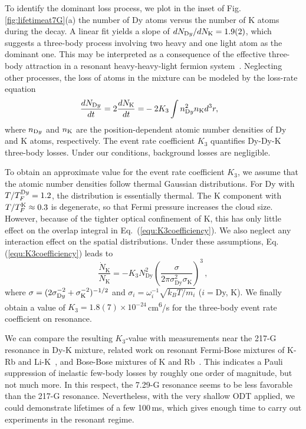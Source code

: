 To identify the dominant loss process, we plot in the inset of Fig.\,\ref{fig:lifetimeat7G}(a) the number of Dy atoms versus the number of K atoms during the decay. A linear fit yields a slope of $dN_{\textrm Dy}/dN_{\textrm K} = 1.9(2)$, which suggests a three-body process involving two heavy and one light atom as the dominant one. This may be interpreted as a consequence of the effective three-body attraction in a resonant heavy-heavy-light fermion system~\cite{Levinsen2011ada, Jag2014ooa}. Neglecting other processes, the loss of atoms in the mixture can be modeled by the loss-rate equation
\begin{equation}
	\begin{aligned}
		\frac{d N_{\textrm Dy}}{d t}=2\frac{d N_{\textrm K}}{d t}=&-2K_3 \int n_{\textrm Dy}^{2} n_{\textrm K} d^{3} r,
	\end{aligned}
	\label{equ:K3coefficiency}
\end{equation}
where $n_{\textrm Dy}$ and $n_{\textrm K}$ are the position-dependent atomic number densities of Dy and K atoms, respectively. The event rate coefficient $K_3$ quantifies Dy-Dy-K three-body losses. Under our conditions, background losses are negligible.

To obtain an approximate value for the event rate coefficient $K_3$, we assume that the atomic number densities follow thermal Gaussian distributions. For Dy with $T/T_F^{\textrm Dy} = 1.2$, the distribution is essentially thermal. The K component with $T/T_F^{\textrm K}\approx 0.3$ is degenerate, so that Fermi pressure increases the cloud size. However, because of the tighter optical confinement of K, this has only little effect on the overlap integral in Eq.~(\ref{equ:K3coefficiency}). We also neglect any interaction effect on the spatial distributions. Under these assumptions, Eq.\,(\ref{equ:K3coefficiency}) leads to~\cite{Ravensbergen2020rif}
\begin{equation}
	\frac{\dot{N}_{\mathrm{K}}}{N_{\mathrm{K}}}=-K_3 N^2_{\mathrm{Dy}}\left(\frac{\sigma}{2 \pi \sigma_{\mathrm{Dy}}^{2} \sigma_{\mathrm{K}}}\right)^{3}\,,
	\label{equ:K3coefficiencySimplied}
\end{equation}
where $\sigma=(2\sigma^{-2}_{\textrm Dy}+\sigma^{-2}_{\textrm K})^{-1/2}$ and $\sigma_{i}=\omega^{-1}_i\sqrt{k_BT/m_i}$ ($i=$Dy, K). We finally obtain a value of $K_3=1.8(7)\times10^{-24}$\,\si{cm^6/s} for the three-body event rate coefficient on resonance.

We can compare the resulting $K_3$-value with measurements near the 217-G resonance in Dy-K mixture, related work on resonant Fermi-Bose mixtures of K-Rb and Li-K~\cite{Bloom2013tou, Lous2018pti}, and Bose-Bose mixtures of K and Rb~\cite{Wacker2016utb}. This indicates a Pauli suppression of inelastic few-body losses by roughly one order of magnitude, but not much more. In this respect, the 7.29-G resonance seems to be less favorable than the 217-G resonance. Nevertheless, with the very shallow ODT applied, we could demonstrate lifetimes of a few 100\,ms, which gives enough time to carry out experiments in the resonant regime. 


